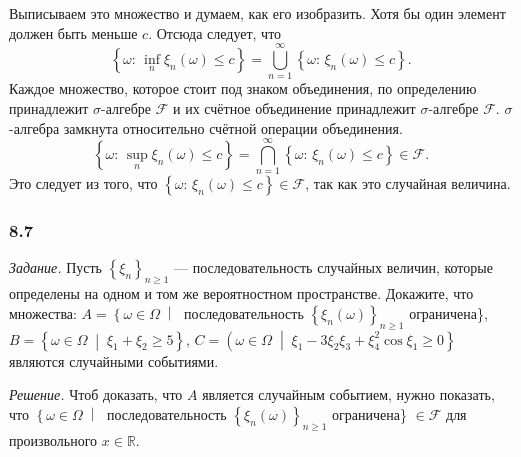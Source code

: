 Выписываем это множество и думаем, как его изобразить.
Хотя бы один элемент должен быть меньше $c$.
Отсюда следует, что
$$ \left\{ \omega: \,
\inf \limits_{n} \xi_n \left( \omega \right) \leq
c \right\} =
\bigcup \limits_{n=1}^{ \infty } \left\{ \omega: \,
\xi_n \left( \omega \right) \leq
c \right\}.$$
Каждое множество,
которое стоит под знаком объединения, по определению принадлежит $ \sigma $-алгебре $ \mathcal{F} $ и их счётное объединение принадлежит $ \sigma $-алгебре $ \mathcal{F} $.
$ \sigma $-алгебра замкнута относительно счётной операции объединения.
$$ \left\{ \omega: \,
\sup \limits_{n} \xi_n \left( \omega \right) \leq
c \right\} =
\bigcap \limits_{n=1}^{ \infty } \left\{ \omega: \,
\xi_n \left( \omega \right) \leq c \right\} \in
\mathcal{F}.$$
Это следует из того, что $\left\{ \omega: \, \xi_n \left( \omega \right) \leq c \right\} \in \mathcal{F} $, так как это случайная величина.

\subsubsection*{8.7}

\textit{Задание.} Пусть $ \left\{ \xi_n \right\}_{n \geq 1}$ --- последовательность случайных величин, которые определены на одном и том же вероятностном пространстве.
Докажите, что множества: $A = \left\{ \omega \in \Omega \; \middle| \; \right.$ последовательность $ \left\{ \xi_n \left( \omega \right) \right\}_{n \geq 1}$ ограничена\},
$B =
\left\{ \omega \in \Omega \; \middle| \; \xi_1 + \xi_2 \geq 5 \right\}, \,
C =
\left( \omega \in \Omega \; \middle| \; \xi_1 -3 \xi_2 \xi_3 + \xi_4^2 \cos \xi_1 \geq 0 \right\} $
являются случайными событиями.

\textit{Решение.} Чтоб доказать, что $A$ является случайным событием, нужно показать, что $ \left\{ \omega \in \Omega \; \middle| \; \right. $ последовательность $ \left\{ \xi_n \left( \omega \right) \right\}_{n \geq 1}$ ограничена\} $ \in \mathcal{F} $ для произвольного $x \in \mathbb{R} $.

